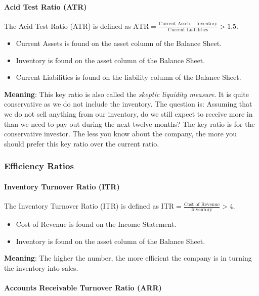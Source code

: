 \paragraph{Acid Test Ratio (ATR)}

The Acid Test Ratio (ATR) is defined as
$\text{ATR} = \frac{\text{Current Assets - Inventory}}{\text{Current Liabilities}} > 1.5$.
\begin{itemize}
    \item Current Assets is found on the asset column of the Balance Sheet.
    \item Inventory is found on the asset column of the Balance Sheet.
    \item Current Liabilities is found on the liability column of the Balance Sheet.
\end{itemize}
\textbf{Meaning}: This key ratio is also called the \textit{skeptic liquidity measure}.
It is quite conservative as we do not include the inventory. The question is: Assuming
that we do not sell anything from our inventory, do we still expect to receive
more in than we need to pay out during the next twelve months? The key ratio is
for the conservative investor. The less you know about the company, the more you
should prefer this key ratio over the current ratio.

\subsubsection{Efficiency Ratios}

\paragraph{Inventory Turnover Ratio (ITR)}

The Inventory Turnover Ratio (ITR) is defined as
$\text{ITR} = \frac{\text{Cost of Revenue}}{\text{Inventory}} > 4$.
\begin{itemize}
    \item Cost of Revenue is found on the Income Statement.
    \item Inventory is found on the asset column of the Balance Sheet.
\end{itemize}
\textbf{Meaning}: The higher the number, the more efficient the company is in
turning the inventory into sales.

\paragraph{Accounts Receivable Turnover Ratio (ARR)}

